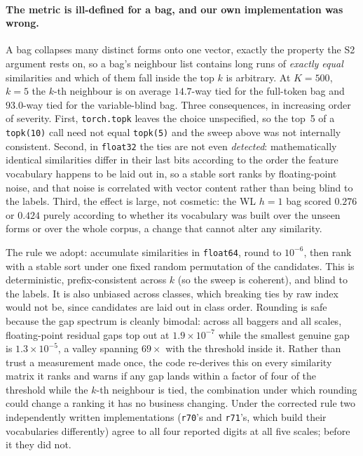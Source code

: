 \paragraph{The metric is ill-defined for a bag, and our own implementation was wrong.} A bag collapses many distinct forms onto one vector, exactly the property the S2 argument rests on, so a bag's neighbour list contains long runs of \emph{exactly equal} similarities and which of them fall inside the top $k$ is arbitrary. At $K{=}500$, $k{=}5$ the $k$-th neighbour is on average $14.7$-way tied for the full-token bag and $93.0$-way tied for the variable-blind bag. Three consequences, in increasing order of severity. First, \texttt{torch.topk} leaves the choice unspecified, so the top~5 of a \texttt{topk(10)} call need not equal \texttt{topk(5)} and the sweep above was not internally consistent. Second, in \texttt{float32} the ties are not even \emph{detected}: mathematically identical similarities differ in their last bits according to the order the feature vocabulary happens to be laid out in, so a stable sort ranks by floating-point noise, and that noise is correlated with vector content rather than being blind to the labels. Third, the effect is large, not cosmetic: the WL $h{=}1$ bag scored $0.276$ or $0.424$ purely according to whether its vocabulary was built over the unseen forms or over the whole corpus, a change that cannot alter any similarity.

The rule we adopt: accumulate similarities in \texttt{float64}, round to $10^{-6}$, then rank with a stable sort under one fixed random permutation of the candidates. This is deterministic, prefix-consistent across $k$ (so the sweep is coherent), and blind to the labels. It is also unbiased across classes, which breaking ties by raw index would not be, since candidates are laid out in class order. Rounding is safe because the gap spectrum is cleanly bimodal: across all baggers and all scales, floating-point residual gaps top out at $1.9\times10^{-7}$ while the smallest genuine gap is $1.3\times10^{-5}$, a valley spanning $69\times$ with the threshold inside it. Rather than trust a measurement made once, the code re-derives this on every similarity matrix it ranks and warns if any gap lands within a factor of four of the threshold while the $k$-th neighbour is tied, the combination under which rounding could change a ranking it has no business changing. Under the corrected rule two independently written implementations (\texttt{r70}'s and \texttt{r71}'s, which build their vocabularies differently) agree to all four reported digits at all five scales; before it they did not.

